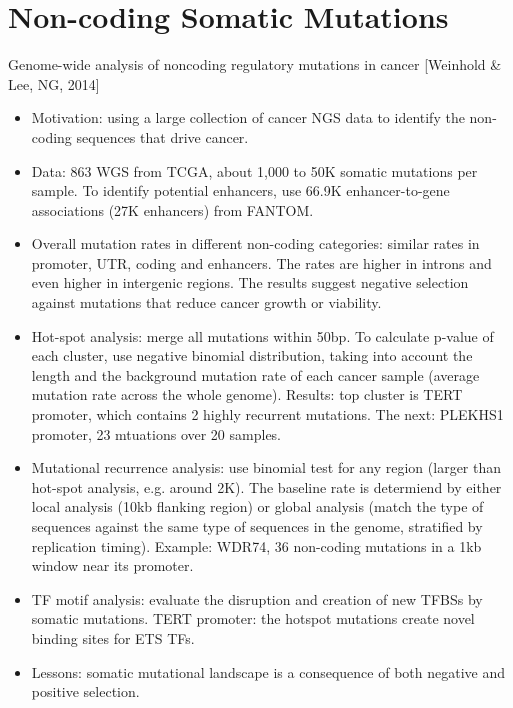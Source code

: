 \documentclass{report}
\begin{document}
\section{Non-coding Somatic Mutations}

Genome-wide analysis of noncoding regulatory mutations in cancer [Weinhold \& Lee, NG, 2014]
\begin{itemize}
	\item Motivation: using a large collection of cancer NGS data to identify the non-coding sequences that drive cancer. 
	
	\item Data: 863 WGS from TCGA, about 1,000 to 50K somatic mutations per sample. To identify potential enhancers, use 66.9K enhancer-to-gene associations (27K enhancers) from FANTOM. 
	
	\item Overall mutation rates in different non-coding categories: similar rates in promoter, UTR, coding and enhancers. The rates are higher in introns and even higher in intergenic regions. The results suggest negative selection against mutations that reduce cancer growth or viability. 
	
	\item Hot-spot analysis: merge all mutations within 50bp. To calculate p-value of each cluster, use negative binomial distribution, taking into account the length and the background mutation rate of each cancer sample (average mutation rate across the whole genome). Results: top cluster is TERT promoter, which contains 2 highly recurrent mutations. The next: PLEKHS1 promoter, 23 mtuations over 20 samples. 
	
	\item Mutational recurrence analysis: use binomial test for any region (larger than hot-spot analysis, e.g. around 2K). The baseline rate is determiend by either local analysis (10kb flanking region) or global analysis (match the type of sequences against the same type of sequences in the genome, stratified by replication timing). Example: WDR74, 36 non-coding mutations in a 1kb window near its promoter. 
	
	\item TF motif analysis: evaluate the disruption and creation of new TFBSs by somatic mutations. TERT promoter: the hotspot mutations create novel binding sites for ETS TFs. 
	
	\item Lessons: somatic mutational landscape is a consequence of both negative and positive selection. 
\end{itemize}
\end{document}
